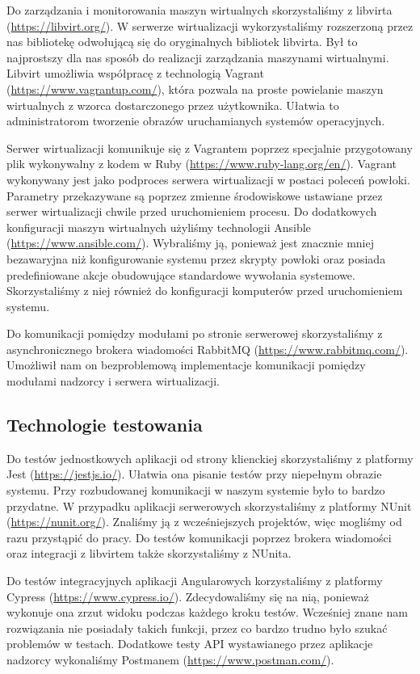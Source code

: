 \documentclass[../opis-rozwiazania.tex]{subfiles}
\begin{document}
Do zarządzania i monitorowania maszyn wirtualnych skorzystaliśmy z libvirta (\url{https://libvirt.org/}).
W serwerze wirtualizacji wykorzystaliśmy rozszerzoną przez nas bibliotekę odwołującą się do oryginalnych bibliotek libvirta.
Był to najprostszy dla nas sposób do realizacji zarządzania maszynami wirtualnymi.
Libvirt umożliwia współpracę z technologią Vagrant (\url{https://www.vagrantup.com/}), która pozwala na proste powielanie maszyn wirtualnych z wzorca dostarczonego przez użytkownika.
Ułatwia to administratorom tworzenie obrazów uruchamianych systemów operacyjnych.

Serwer wirtualizacji komunikuje się z Vagrantem poprzez specjalnie przygotowany plik wykonywalny z kodem w Ruby (\url{https://www.ruby-lang.org/en/}).
Vagrant wykonywany jest jako podproces serwera wirtualizacji w postaci poleceń powłoki.
Parametry przekazywane są poprzez zmienne środowiskowe ustawiane przez serwer wirtualizacji chwile przed uruchomieniem procesu.
Do dodatkowych konfiguracji maszyn wirtualnych użyliśmy technologii Ansible (\url{https://www.ansible.com/}).
Wybraliśmy ją, ponieważ jest znacznie mniej bezawaryjna niż konfigurowanie systemu przez skrypty powłoki oraz posiada predefiniowane akcje obudowujące standardowe wywołania systemowe.
Skorzystaliśmy z niej również do konfiguracji komputerów przed uruchomieniem systemu.

Do komunikacji pomiędzy modułami po stronie serwerowej skorzystaliśmy z asynchronicznego brokera wiadomości RabbitMQ (\url{https://www.rabbitmq.com/}).
Umożliwił nam on bezproblemową implementacje komunikacji pomiędzy modułami nadzorcy i serwera wirtualizacji.

\subsection{Technologie testowania}
Do testów jednostkowych aplikacji od strony klienckiej skorzystaliśmy z platformy Jest (\url{https://jestjs.io/}).
Ułatwia ona pisanie testów przy niepełnym obrazie systemu. Przy rozbudowanej komunikacji w naszym systemie było to bardzo przydatne.
W przypadku aplikacji serwerowych skorzystaliśmy z platformy NUnit (\url{https://nunit.org/}).
Znaliśmy ją z wcześniejszych projektów, więc mogliśmy od razu przystąpić do pracy.
Do testów komunikacji poprzez brokera wiadomości oraz integracji z libvirtem także skorzystaliśmy z NUnita.

Do testów integracyjnych aplikacji Angularowych korzystaliśmy z platformy Cypress (\url{https://www.cypress.io/}).
Zdecydowaliśmy się na nią, ponieważ wykonuje ona zrzut widoku podczas każdego kroku testów.
Wcześniej znane nam rozwiązania nie posiadały takich funkcji, przez co bardzo trudno było szukać problemów w testach.
Dodatkowe testy API wystawianego przez aplikacje nadzorcy wykonaliśmy Postmanem (\url{https://www.postman.com/}).
\end{document}
